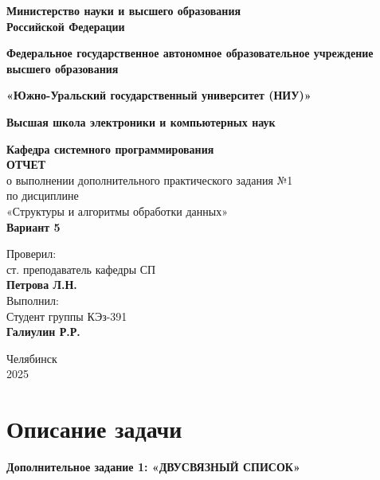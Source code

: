\documentclass[a4paper,12pt]{article}
\begin{document}
	\begin{titlepage}
		\begin{center}
			{\large \textbf{Министерство науки и высшего образования \\ Российской Федерации}}
			
			{\large\textbf{Федеральное государственное автономное образовательное учреждение высшего образования}}
			
			{\large \textbf{«Южно-Уральский государственный университет (НИУ)»}}
			
			{\large \textbf{Высшая школа электроники и компьютерных наук}}
			
			{\large \textbf{Кафедра системного программирования}\\[2cm]
			}
			\textbf{ОТЧЕТ}\\[0.2cm]
			о выполнении дополнительного практического задания №1\\[0.2cm]
			по дисциплине\\[0.2cm]
			«Структуры и алгоритмы обработки данных»\\[0.2cm]
			\textbf{Вариант 5}\\[3cm]
		\end{center}
		
		\begin{flushright}
			Проверил:\\[0.2cm]
			ст. преподаватель кафедры СП\\[0.2cm]
			\textbf{Петрова Л.Н.}\\[1cm]
						
			Выполнил:\\[0.2cm]
			Студент группы КЭз-391\\[0.2cm]
			\textbf{Галиулин Р.Р.}\\[0.2cm]
			
		\end{flushright}
		\vfill{}
		
		\begin{center}
			Челябинск \\ 2025
		\end{center}
	\end{titlepage}
	\newpage
	
	\tableofcontents
	
	\setcounter{page}{2}
	\newpage
	\section{Описание задачи}
	\textbf{Дополнительное задание 1: «ДВУСВЯЗНЫЙ СПИСОК»}
	
\end{document}
